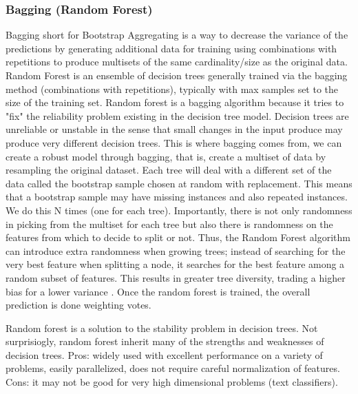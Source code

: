 \documentclass[11pt]{article}
\theoremstyle{definition}
\theoremstyle{remark}
\begin{document}
\subsubsection{Bagging (Random Forest)}
\label{sse:rf}
Bagging short for Bootstrap Aggregating is a way to decrease the variance of the predictions by generating additional data for training using combinations with repetitions to produce multisets of the same cardinality/size as the original data.
Random Forest is an ensemble of decision trees generally trained via the bagging method (combinations with repetitions), typically with max samples set to the size of the training set. Random forest is a bagging algorithm because it tries to "fix" the reliability problem existing in the decision tree model. Decision trees are unreliable or unstable in the sense that small changes in the input  produce may produce very different decision trees. This is where bagging comes from, we can create a robust model through bagging, that is, create a multiset of data by resampling the original dataset. Each tree will deal with a different set of the data called the bootstrap sample chosen at random with replacement. This means that a bootstrap sample may have missing instances and also repeated instances. We do this N times (one for each tree). Importantly, there is not only randomness in picking from the multiset for each tree but also there is randomness on the features from which to decide to split or not.  
Thus, the Random Forest algorithm can introduce extra randomness when growing trees; instead of searching for the very best feature when splitting a node, it searches for the best feature among a random subset of features. This results in greater tree diversity,  trading a higher bias for a lower variance \cite{geron2017hands}. Once the random forest is trained, the overall prediction is done weighting votes. %

Random forest is a solution to the stability problem in decision trees. Not surprisiogly, random forest inherit many of the strengths and weaknesses of decision trees. Pros: widely used with excellent performance on a variety of problems, easily parallelized, does not require careful normalization of features. Cons: it may not be good for very high dimensional problems (text classifiers). 
\end{document}
